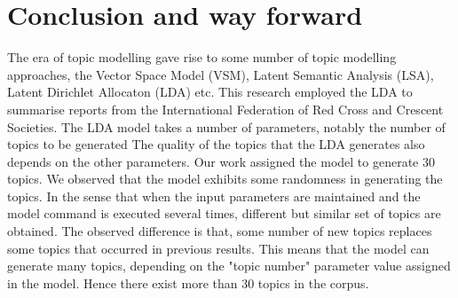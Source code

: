 
\chapter{Conclusion and way forward}

The era of topic modelling gave rise to some number of topic modelling approaches, the Vector Space Model (VSM), Latent Semantic Analysis (LSA), Latent Dirichlet Allocaton (LDA) etc. This research employed the LDA to summarise reports from the International Federation of Red Cross and Crescent Societies. The LDA model takes a number of parameters, notably the number of topics to be generated The quality of the topics that the LDA generates also depends on the other parameters. Our work assigned the model to generate 30 topics. We observed that the model exhibits some randomness in generating the topics. In the sense that when the input parameters are maintained and the model command is executed several times, different but similar set of topics are obtained. The observed difference is that, some number of new topics replaces some topics that occurred in previous results. This means that the model can generate  many topics, depending on the "topic number" parameter value assigned in the model. Hence there exist more than 30 topics in the corpus.

